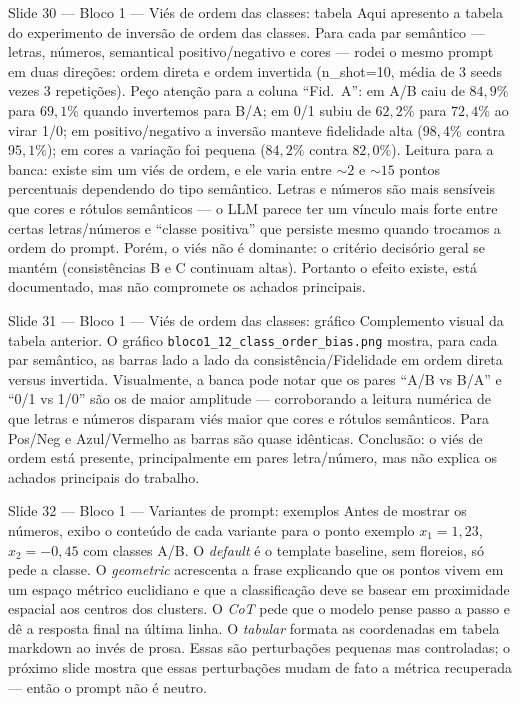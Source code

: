 \documentclass[aspectratio=169,10pt]{beamer}
\begin{document}
\begin{frame}{Slide 30 --- Bloco 1 --- Vi\'es de ordem das classes: tabela}
\footnotesize
Aqui apresento a tabela do experimento de invers\~ao de ordem das classes. Para cada par sem\^antico --- letras, n\'umeros, semantical positivo/negativo e cores --- rodei o mesmo prompt em duas dire\c{c}\~oes: ordem direta e ordem invertida (n\_shot=10, m\'edia de 3 seeds vezes 3 repeti\c{c}\~oes). Pe\c{c}o aten\c{c}\~ao para a coluna ``Fid.\ A'': em A/B caiu de $84{,}9\%$ para $69{,}1\%$ quando invertemos para B/A; em 0/1 subiu de $62{,}2\%$ para $72{,}4\%$ ao virar 1/0; em positivo/negativo a invers\~ao manteve fidelidade alta ($98{,}4\%$ contra $95{,}1\%$); em cores a varia\c{c}\~ao foi pequena ($84{,}2\%$ contra $82{,}0\%$). Leitura para a banca: existe sim um vi\'es de ordem, e ele varia entre $\sim 2$ e $\sim 15$ pontos percentuais dependendo do tipo sem\^antico. Letras e n\'umeros s\~ao mais sens\'iveis que cores e r\'otulos sem\^anticos --- o LLM parece ter um v\'inculo mais forte entre certas letras/n\'umeros e ``classe positiva'' que persiste mesmo quando trocamos a ordem do prompt. Por\'em, o vi\'es n\~ao \'e dominante: o critério decis\'orio geral se mant\'em (consist\^encias B e C continuam altas). Portanto o efeito existe, est\'a documentado, mas n\~ao compromete os achados principais.
\end{frame}

\begin{frame}{Slide 31 --- Bloco 1 --- Vi\'es de ordem das classes: gr\'afico}
\footnotesize
Complemento visual da tabela anterior. O gr\'afico \texttt{bloco1\_12\_class\_order\_bias.png} mostra, para cada par sem\^antico, as barras lado a lado da consist\^encia/Fidelidade em ordem direta versus invertida. Visualmente, a banca pode notar que os pares ``A/B vs B/A'' e ``0/1 vs 1/0'' s\~ao os de maior amplitude --- corroborando a leitura num\'erica de que letras e n\'umeros disparam vi\'es maior que cores e r\'otulos sem\^anticos. Para Pos/Neg e Azul/Vermelho as barras s\~ao quase id\^enticas. Conclus\~ao: o vi\'es de ordem est\'a presente, principalmente em pares letra/n\'umero, mas n\~ao explica os achados principais do trabalho.
\end{frame}

\begin{frame}{Slide 32 --- Bloco 1 --- Variantes de prompt: exemplos}
\footnotesize
Antes de mostrar os n\'umeros, exibo o conte\'udo de cada variante para o ponto exemplo $x_1=1{,}23$, $x_2=-0{,}45$ com classes A/B. O \emph{default} \'e o template baseline, sem floreios, s\'o pede a classe. O \emph{geometric} acrescenta a frase explicando que os pontos vivem em um espa\c{c}o m\'etrico euclidiano e que a classifica\c{c}\~ao deve se basear em proximidade espacial aos centros dos clusters. O \emph{CoT} pede que o modelo pense passo a passo e d\^e a resposta final na \'ultima linha. O \emph{tabular} formata as coordenadas em tabela markdown ao inv\'es de prosa. Essas s\~ao perturba\c{c}\~oes pequenas mas controladas; o pr\'oximo slide mostra que essas perturba\c{c}\~oes mudam de fato a m\'etrica recuperada --- ent\~ao o prompt n\~ao \'e neutro.
\end{frame}
\end{document}
